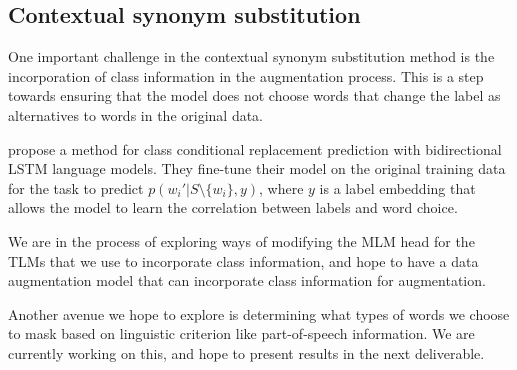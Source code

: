 \documentclass[11pt,a4paper]{article}
\begin{document}
\subsection{Contextual synonym substitution}

One important challenge in the contextual synonym substitution method is the incorporation of class information in the augmentation process. This is a step towards ensuring that the model does not choose words that change the label as alternatives to words in the original data.
 
\citet{kobayashi-2018-contextual} propose a method for class conditional replacement prediction with bidirectional LSTM language models. They fine-tune their model on the original training data for the task to predict $p(w_i'|S\setminus\{w_i\}, y)$, where $y$ is a label embedding that allows the model to learn the correlation between labels and word choice.

We are in the process of exploring ways of modifying the MLM head for the TLMs that we use to incorporate class information, and hope to have a data augmentation model that can incorporate class information for augmentation.

Another avenue we hope to explore is determining what types of words we choose to mask based on linguistic criterion like part-of-speech information. We are currently working on this, and hope to present results in the next deliverable.



\end{document}
